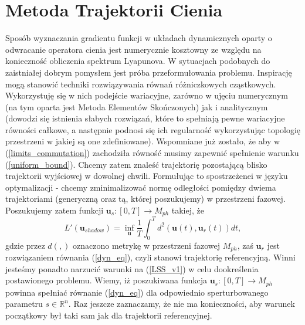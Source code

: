 \documentclass[12pt, twoside]{book}
\begin{document}
\section{Metoda Trajektorii Cienia} 
Sposób wyznaczania gradientu funkcji w układach dynamicznych oparty o odwracanie operatora cienia jest numerycznie kosztowny ze względu na konieczność obliczenia spektrum Lyapunova. \newline
W sytuacjach podobnych do zaistniałej dobrym pomysłem jest próba przeformułowania problemu. Inspirację mogą stanowić techniki rozwiązywania równań różniczkowych cząstkowych. Wykorzystuję się w nich podejście wariacyjne, zarówno w ujęciu numerycznym (na tym oparta jest Metoda Elementów Skończonych) jak i analitycznym (dowodzi się istnienia słabych rozwiązań, które to spełniają pewne wariacyjne równości całkowe, a następnie podnosi się ich regularność wykorzystując topologię przestrzeni w jakiej są one zdefiniowane). Wspomniane już zostało, że aby w (\ref{limits_commutation}) zachodziła równość musimy zapewnić spełnienie warunku (\ref{uniform_bound}). Chcemy zatem znaleść trajektorię pozostającą blisko trajektorii wyjściowej w dowolnej chwili. Formułując to spostrzeżenei w języku optymalizacji - chcemy zminimalizować normę odległości pomiędzy dwiema trajektoriami (generyczną oraz tą, której poszukujemy) w przestrzeni fazowej. Poszukujemy zatem funkcji $ \textbf{u}_s: [0,T] \rightarrow M_{ph} $ takiej, że
\begin{equation}
L'(\textbf{u}_{shadow}) = \inf_{\textbf{u}}\frac{1}{T}\int_{0}^{T}d^{2}(\textbf{u}(t),\textbf{u}_r(t))dt,
\label{LSS_v1}
\end{equation}
gdzie przez $ d(,) $ oznaczono metrykę w przestrzeni fazowej $ M_{ph} $, zaś $ \textbf{u}_r $ jest rozwiązaniem równania (\ref{dyn_eq}), czyli stanowi trajektorię referencyjną. Winni jesteśmy ponadto narzucić warunki na (\ref{LSS_v1}) w celu dookreślenia postawionego problemu. Wiemy, iż poszukiwana funkcja $ \textbf{u}_s: [0,T] \rightarrow M_{ph} $ powinna spełniać równanie (\ref{dyn_eq}) dla odpowiednio sperturbowanego parametru $ s \in \mathbb{R}^{n} $. Raz jeszcze zaznaczamy, że nie ma konieczności, aby warunek początkowy był taki sam jak dla trajektorii referencyjnej.\newline
\end{document}
